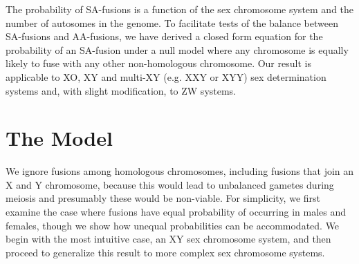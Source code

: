\documentclass[12pt]{article}
\begin{document}
The probability of SA-fusions is a function of the sex chromosome system and the number of autosomes in the genome.
To facilitate tests of the balance between SA-fusions and AA-fusions, we have derived a closed form equation for the probability of an SA-fusion under a null model where any chromosome is equally likely to fuse with any other non-homologous chromosome.
Our result is applicable to XO, XY and multi-XY (e.g. XXY or XYY) sex determination systems and, with slight modification, to ZW systems.


\section{The Model}
We ignore fusions among homologous chromosomes, including fusions that join an X and Y chromosome, because this would lead to unbalanced gametes during meiosis and presumably these would be non-viable.
For simplicity, we first examine the case where fusions have equal probability of occurring in males and females, though we show how unequal probabilities can be accommodated.
We begin with the most intuitive case, an XY sex chromosome system, and then proceed to generalize this result to more complex sex chromosome systems.
\end{document}
